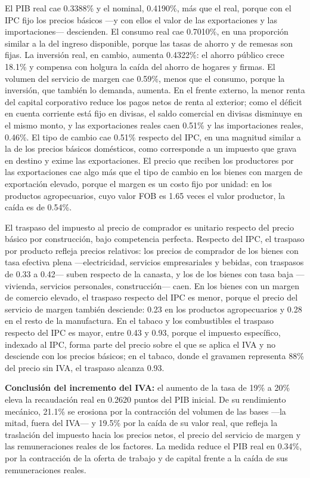 \documentclass[11pt]{article}
\begin{document}
El PIB real cae 0.3388\% y el nominal, 0.4190\%, más que el real, porque con el IPC fijo los precios básicos ---y con ellos el valor de las exportaciones y las importaciones--- descienden. El consumo real cae 0.7010\%, en una proporción similar a la del ingreso disponible, porque las tasas de ahorro y de remesas son fijas. La inversión real, en cambio, aumenta 0.4322\%: el ahorro público crece 18.1\% y compensa con holgura la caída del ahorro de hogares y firmas. El volumen del servicio de margen cae 0.59\%, menos que el consumo, porque la inversión, que también lo demanda, aumenta. En el frente externo, la menor renta del capital corporativo reduce los pagos netos de renta al exterior; como el déficit en cuenta corriente está fijo en divisas, el saldo comercial en divisas disminuye en el mismo monto, y las exportaciones reales caen 0.51\% y las importaciones reales, 0.46\%. El tipo de cambio cae 0.51\% respecto del IPC, en una magnitud similar a la de los precios básicos domésticos, como corresponde a un impuesto que grava en destino y exime las exportaciones. El precio que reciben los productores por las exportaciones cae algo más que el tipo de cambio en los bienes con margen de exportación elevado, porque el margen es un costo fijo por unidad: en los productos agropecuarios, cuyo valor FOB es 1.65 veces el valor productor, la caída es de 0.54\%.

El traspaso del impuesto al precio de comprador es unitario respecto del precio básico por construcción, bajo competencia perfecta. Respecto del IPC, el traspaso por producto refleja precios relativos: los precios de comprador de los bienes con tasa efectiva plena ---electricidad, servicios empresariales y bebidas, con traspasos de 0.33 a 0.42--- suben respecto de la canasta, y los de los bienes con tasa baja ---vivienda, servicios personales, construcción--- caen. En los bienes con un margen de comercio elevado, el traspaso respecto del IPC es menor, porque el precio del servicio de margen también desciende: 0.23 en los productos agropecuarios y 0.28 en el resto de la manufactura. En el tabaco y los combustibles el traspaso respecto del IPC es mayor, entre 0.43 y 0.93, porque el impuesto específico, indexado al IPC, forma parte del precio sobre el que se aplica el IVA y no desciende con los precios básicos; en el tabaco, donde el gravamen representa 88\% del precio sin IVA, el traspaso alcanza 0.93.

\textbf{Conclusión del incremento del IVA:} el aumento de la tasa de 19\% a 20\% eleva la recaudación real en 0.2620 puntos del PIB inicial. De su rendimiento mecánico, 21.1\% se erosiona por la contracción del volumen de las bases ---la mitad, fuera del IVA--- y 19.5\% por la caída de su valor real, que refleja la traslación del impuesto hacia los precios netos, el precio del servicio de margen y las remuneraciones reales de los factores. La medida reduce el PIB real en 0.34\%, por la contracción de la oferta de trabajo y de capital frente a la caída de sus remuneraciones reales.
\end{document}
